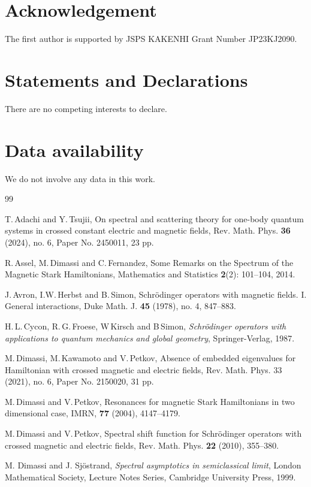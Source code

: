 \documentclass{article}
\theoremstyle{plain}
\theoremstyle{definition}
\theoremstyle{remark}
\begin{document}
\section*{Acknowledgement}
The first author is supported by JSPS KAKENHI Grant Number JP23KJ2090.

\section*{Statements and Declarations}
There are no competing interests to declare. 

\section*{Data availability}
We do not involve any data in this work.

\begin{thebibliography}{99}

T.\,Adachi and Y.\,Tsujii, 
On spectral and scattering theory for one-body quantum systems in crossed constant electric and magnetic fields, 
Rev. Math. Phys. {\bf 36} (2024), no. 6, Paper No. 2450011, 23 pp.

R.\,Assel, M.\,Dimassi and C.\,Fernandez,
Some Remarks on the Spectrum of the Magnetic Stark Hamiltonians,
Mathematics and Statistics {\bf 2}(2): 101--104, 2014.

J.\,Avron, I.W.\,Herbst and B.\,Simon,
Schr\"{o}dinger operators with magnetic fields. I. General interactions, 
Duke Math. J. {\bf 45} (1978), no. 4, 847--883.


H.\,L.\,Cycon, R.\,G.\,Froese, W\,Kirsch and B\,Simon,  
{\em Schr\"{o}dinger operators with applications to quantum mechanics and global geometry}, 
Springer-Verlag, 1987. 

M.\,Dimassi, M.\,Kawamoto and V.\,Petkov, 
Absence of embedded eigenvalues for Hamiltonian with crossed magnetic and electric fields, 
Rev. Math. Phys. 33 (2021), no. 6, Paper No. 2150020, 31 pp.

M.\,Dimassi and V.\,Petkov, 
Resonances for magnetic Stark Hamiltonians in two dimensional case,
IMRN, {\bf 77} (2004), 4147--4179.

M.\,Dimassi and V.\,Petkov, 
Spectral shift function for Schr\"odinger operators with crossed magnetic and electric fields, 
Rev. Math. Phys. {\bf 22} (2010), 355--380.

 M. Dimassi and J. Sj\"ostrand, 
{\em Spectral asymptotics in semiclassical limit}, London Mathematical Society, 
Lecture Notes Series, Cambridge University Press, 1999.


\end{thebibliography}
\end{document}
